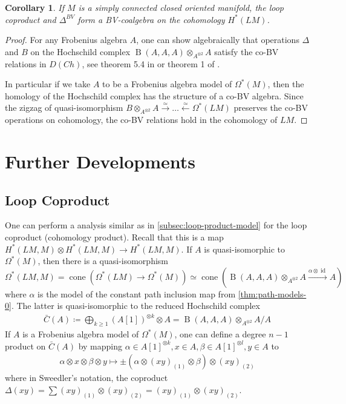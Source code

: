\documentclass{scrartcl}
\theoremstyle{plain}
\newtheorem{corollary}[theorem]{Corollary}
\theoremstyle{definition}
\DeclareMathOperator{\cone}{cone}
\newcommand{\quiso}{\simeq}
\newcommand{\defeq}{\coloneqq}
\let\xto\xrightarrow
\let\xfrom\xleftarrow
\DeclareMathOperator{\id}{id}
\DeclareMathOperator{\BC}{B}
\begin{document}
\begin{corollary}
    If $M$ is a simply connected closed oriented manifold, the loop coproduct and $\Delta^{BV}$ form a BV-coalgebra on the cohomology $H^*(LM)$.
\end{corollary}
\begin{proof}
    For any Frobenius algebra $A$, one can show algebraically that operations $\Delta$ and $B$ on the Hochschild complex $\BC(A, A, A)\otimes_{A^{\otimes 2}} A$ satisfy the co-BV relations in $D(Ch)$, see theorem 5.4 in \cite{abbaspour2015algebraic} or theorem 1 of \cite{tradler2008bvalg}.

    In particular if we take $A$ to be a Frobenius algebra model of $\Omega^*(M)$, then the homology of the Hochschild complex has the structure of a co-BV algebra. Since the zigzag of quasi-isomorphism $B\otimes_{A^{\otimes 2}}A\xto{\quiso}\dots\xfrom{\quiso} \Omega^*(LM)$ preserves the co-BV operations on cohomology, the co-BV relations hold in the cohomology of $LM$. 
\end{proof}





\section{Further Developments}
\subsection{Loop Coproduct}
One can perform a analysis similar as in \cref{subsec:loop-product-model} for the loop coproduct (cohomology product). Recall that this is a map $H^*(LM, M)\otimes H^*(LM, M)\to H^*(LM, M)$. If $A$ is quasi-isomorphic to $\Omega^*(M)$, then there is a quasi-isomorphism $\Omega^*(LM, M) = \cone(\Omega^*(LM)\to \Omega^*(M))\quiso \cone(\BC(A, A, A)\otimes_{A^{\otimes 2}} A \xto{\alpha\otimes \id} A)$ where $\alpha$ is the model of the constant path inclusion map from \cref{thm:path-models-0}. The latter is quasi-isomorphic to the reduced Hochschild complex
\begin{align*}
\bar C(A) \defeq \bigoplus_{k\geq 1} (A[1])^{\otimes  k} \otimes A = \BC(A, A, A)\otimes_{A^{\otimes 2}} A / A
\end{align*}
If $A$ is a Frobenius algebra model of $\Omega^*(M)$, one can define a degree $n-1$ product on $\bar C(A)$ by mapping $\alpha\in A[1]^{\otimes k}, x\in A, \beta\in A[1]^{\otimes l}, y\in A$ to 
\begin{align*}
    \alpha\otimes x\otimes \beta\otimes y  \mapsto  \pm (\alpha \otimes (xy)_{(1)}\otimes\beta)\otimes (xy)_{(2)}
\end{align*}
where in Sweedler's notation, the coproduct $\Delta(xy) = \sum (xy)_{(1)} \otimes (xy)_{(2)} = (xy)_{(1)} \otimes (xy)_{(2)}$.
\end{document}
